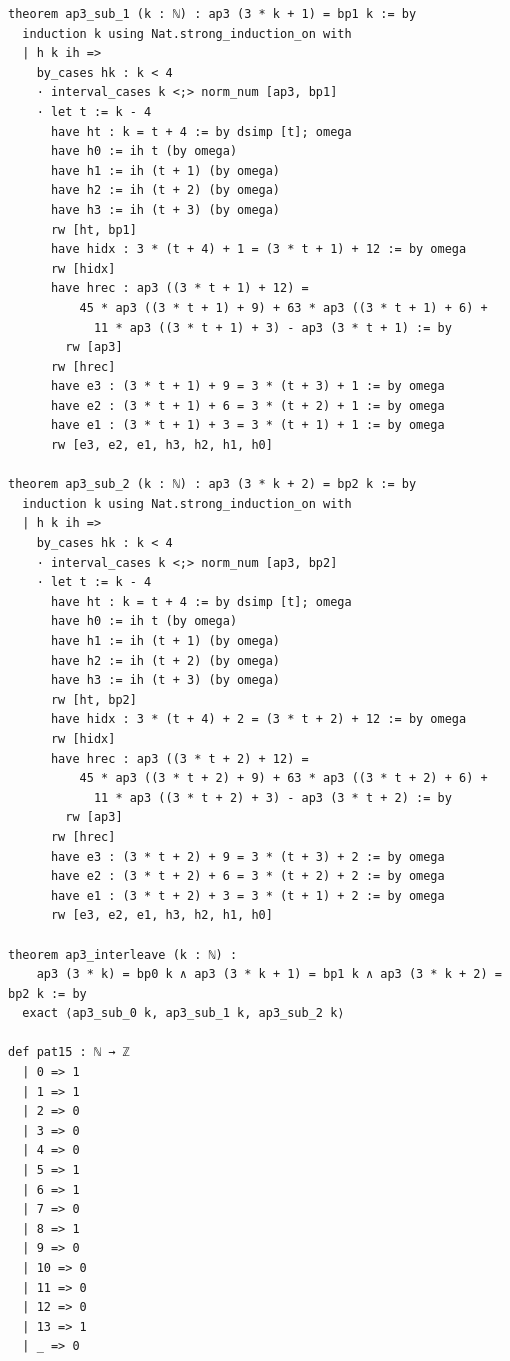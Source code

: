 \documentclass[11pt]{article}
\begin{document}
\begin{lstlisting}
theorem ap3_sub_1 (k : ℕ) : ap3 (3 * k + 1) = bp1 k := by
  induction k using Nat.strong_induction_on with
  | h k ih =>
    by_cases hk : k < 4
    · interval_cases k <;> norm_num [ap3, bp1]
    · let t := k - 4
      have ht : k = t + 4 := by dsimp [t]; omega
      have h0 := ih t (by omega)
      have h1 := ih (t + 1) (by omega)
      have h2 := ih (t + 2) (by omega)
      have h3 := ih (t + 3) (by omega)
      rw [ht, bp1]
      have hidx : 3 * (t + 4) + 1 = (3 * t + 1) + 12 := by omega
      rw [hidx]
      have hrec : ap3 ((3 * t + 1) + 12) =
          45 * ap3 ((3 * t + 1) + 9) + 63 * ap3 ((3 * t + 1) + 6) +
            11 * ap3 ((3 * t + 1) + 3) - ap3 (3 * t + 1) := by
        rw [ap3]
      rw [hrec]
      have e3 : (3 * t + 1) + 9 = 3 * (t + 3) + 1 := by omega
      have e2 : (3 * t + 1) + 6 = 3 * (t + 2) + 1 := by omega
      have e1 : (3 * t + 1) + 3 = 3 * (t + 1) + 1 := by omega
      rw [e3, e2, e1, h3, h2, h1, h0]

theorem ap3_sub_2 (k : ℕ) : ap3 (3 * k + 2) = bp2 k := by
  induction k using Nat.strong_induction_on with
  | h k ih =>
    by_cases hk : k < 4
    · interval_cases k <;> norm_num [ap3, bp2]
    · let t := k - 4
      have ht : k = t + 4 := by dsimp [t]; omega
      have h0 := ih t (by omega)
      have h1 := ih (t + 1) (by omega)
      have h2 := ih (t + 2) (by omega)
      have h3 := ih (t + 3) (by omega)
      rw [ht, bp2]
      have hidx : 3 * (t + 4) + 2 = (3 * t + 2) + 12 := by omega
      rw [hidx]
      have hrec : ap3 ((3 * t + 2) + 12) =
          45 * ap3 ((3 * t + 2) + 9) + 63 * ap3 ((3 * t + 2) + 6) +
            11 * ap3 ((3 * t + 2) + 3) - ap3 (3 * t + 2) := by
        rw [ap3]
      rw [hrec]
      have e3 : (3 * t + 2) + 9 = 3 * (t + 3) + 2 := by omega
      have e2 : (3 * t + 2) + 6 = 3 * (t + 2) + 2 := by omega
      have e1 : (3 * t + 2) + 3 = 3 * (t + 1) + 2 := by omega
      rw [e3, e2, e1, h3, h2, h1, h0]

theorem ap3_interleave (k : ℕ) :
    ap3 (3 * k) = bp0 k ∧ ap3 (3 * k + 1) = bp1 k ∧ ap3 (3 * k + 2) = bp2 k := by
  exact ⟨ap3_sub_0 k, ap3_sub_1 k, ap3_sub_2 k⟩

def pat15 : ℕ → ℤ
  | 0 => 1
  | 1 => 1
  | 2 => 0
  | 3 => 0
  | 4 => 0
  | 5 => 1
  | 6 => 1
  | 7 => 0
  | 8 => 1
  | 9 => 0
  | 10 => 0
  | 11 => 0
  | 12 => 0
  | 13 => 1
  | _ => 0


\end{lstlisting}
\end{document}
